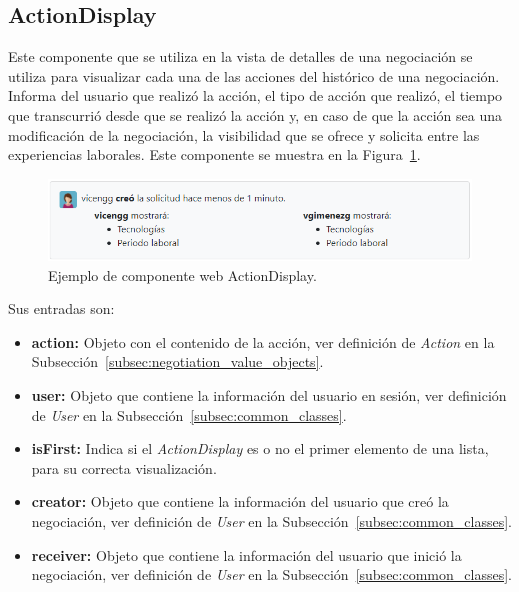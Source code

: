 \documentclass[a4paper, 12pt]{book}
\begin{document}
    \subsection{ActionDisplay}
    \label{subsec:wc_action_display}
    Este componente que se utiliza en la vista de detalles de una negociación se utiliza para visualizar cada una de las acciones del histórico de una negociación.
    Informa del usuario que realizó la acción, el tipo de acción que realizó, el tiempo que transcurrió desde que se realizó la acción y, en caso de que la acción sea una modificación de la negociación, la visibilidad que se ofrece y solicita entre las experiencias laborales.
    Este componente se muestra en la Figura~\ref{fig:component_action_display}.

    \begin{figure}
        \centering
        \includegraphics[width=15cm, keepaspectratio]{img/ActionDisplay.PNG}
        \caption{Ejemplo de componente web ActionDisplay.}\label{fig:component_action_display}
    \end{figure}

    Sus entradas son:

    \begin{itemize}
        \item \textbf{action:} Objeto con el contenido de la acción, ver definición de \emph{Action} en la Subsección~\ref{subsec:negotiation_value_objects}.
        \item \textbf{user:} Objeto que contiene la información del usuario en sesión, ver definición de \emph{User} en la Subsección~\ref{subsec:common_classes}.
        \item \textbf{isFirst:} Indica si el \emph{ActionDisplay} es o no el primer elemento de una lista, para su correcta visualización.
        \item \textbf{creator:} Objeto que contiene la información del usuario que creó la negociación, ver definición de \emph{User} en la Subsección~\ref{subsec:common_classes}.
        \item \textbf{receiver:} Objeto que contiene la información del usuario que inició la negociación, ver definición de \emph{User} en la Subsección~\ref{subsec:common_classes}.
    \end{itemize}
\end{document}
